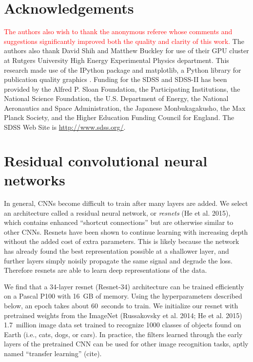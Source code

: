 \documentclass[fleqn,usenatbib]{mnras}
\newcommand{\editorial}[1]{\textcolor{red}{#1}}
\begin{document}
\section*{Acknowledgements}
\editorial{The authors also wish to thank the anonymous referee whose comments and suggestions significantly improved both the quality and clarity of this work.}
The authors also thank David Shih and Matthew Buckley for use of their GPU cluster at Rutgers University High Energy Experimental Physics department. %
This research made use of the {\sc IPython} package \citep{Perez2007} and {\sc matplotlib}, a Python library for publication quality graphics \citep{Hunter2007}. Funding for the SDSS and SDSS-II has been provided by the Alfred P. Sloan Foundation, the Participating Institutions, the National Science Foundation, the U.S. Department of Energy, the National Aeronautics and Space Administration, the Japanese Monbukagakusho, the Max Planck Society, and the Higher Education Funding Council for England. The SDSS Web Site is \url{http://www.sdss.org/}.



\appendix
%
\section{Residual convolutional neural networks}
%

In general, CNNs become difficult to train after many layers are added.
We select an architecture called a residual neural network, or \textit{resnets} (He et al. 2015), which contains enhanced ``shortcut connections'' but are otherwise similar to other CNNs.
Resnets have been shown to continue learning with increasing depth without the added cost of extra parameters.
This is likely because the network has already found the best representation possible at a shallower layer, and further layers simply noisily propagate the same signal and degrade the loss.
Therefore resnets are able to learn deep representations of the data.

We find that a 34-layer resnet (Resnet-34) architecture can be trained efficiently on a Pascal P100 with 16~GB of memory.
Using the hyperparameters described below, an epoch takes about 60~seconds to train.
We initialize our resnet with pretrained weights from the ImageNet (Russakovsky et al. 2014; He et al. 2015) 1.7~million image data set trained to recognize 1000 classes of objects found on Earth (i.e., cats, dogs, or cars).
In practice, the filters learned through the early layers of the pretrained CNN can be used for other image recognition tasks, aptly named ``transfer learning'' (cite).
\end{document}

